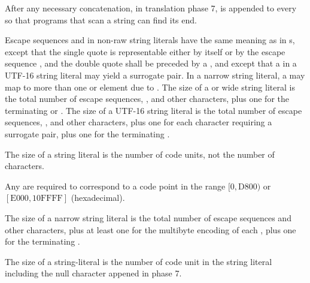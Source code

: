 \documentclass{wg21}
\begin{document}
\pnum
{}%
%
%
After any necessary concatenation, in translation phase
7,  is appended to every
 so that programs that scan a string can find its end.

\begin{removedblock}
\pnum
Escape sequences and  in non-raw string literals
have the same meaning as in s, except that
the single quote  is representable either by itself or by the escape sequence
, and the double quote  shall be preceded by a
\tcode{\textbackslash},
and except that a  in a
UTF-16 string literal may yield a surrogate pair.
%
In a narrow string literal, a  may map to more
than one  or  element due to . The
size of a  or wide string literal is the total number of
escape sequences, , and other characters, plus
one for the terminating  or
. The size of a UTF-16 string
literal is the total number of escape sequences,
, and other characters, plus one for each
character requiring a surrogate pair, plus one for the terminating
.
\begin{note}
    The size of a 
    string literal is the number of code units, not the number of
    characters.
\end{note}
\begin{note}
    Any  are required to
    correspond to a code point in the range
    $[0, \mathrm{D800})$ or $[\mathrm{E000}, \mathrm{10FFFF}]$ (hexadecimal).
\end{note}
The size of a narrow string literal is
the total number of escape sequences and other characters, plus at least
one for the multibyte encoding of each , plus
one for the terminating .
\end{removedblock}

\begin{addedblock}
The size of a string-literal is the number of code unit in the string literal including the null character appened in phase 7.
\end{addedblock}
\end{document}
